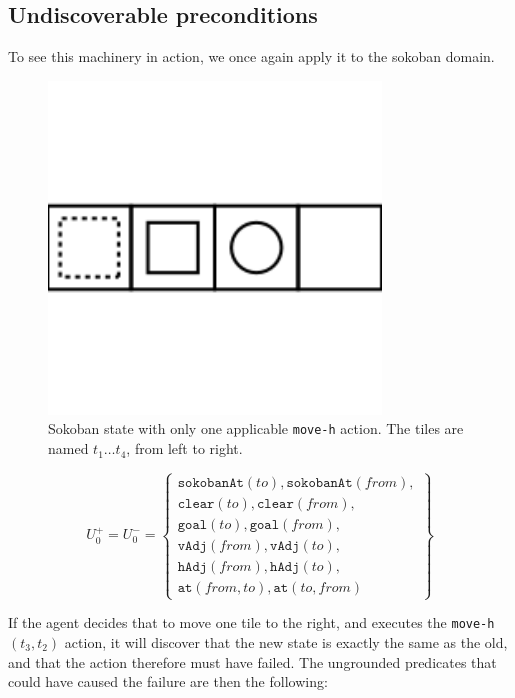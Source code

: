 \documentclass[../Master.tex]{subfiles}
\begin{document}
\subsection{Undiscoverable preconditions}

To see this machinery in action, we once again apply it to the sokoban domain.

\begin{figure}
    \centering
    \includegraphics[scale=0.7]{../Graphics/sokoSmall}
    \caption{\label{fig:sokoSmall} Sokoban state with only one applicable \texttt{move-h} action. The tiles are named $t_1 \dots t_4$, from left to right.}
\end{figure}


\begin{equation}
U_0^+ = U_0^- =
\left\{
    \begin{gathered}
        \texttt{sokobanAt}(to), \texttt{sokobanAt}(from), \\
        \texttt{clear}(to), \texttt{clear}(from), \\
        \texttt{goal}(to), \texttt{goal}(from), \\
        \texttt{vAdj}(from), \texttt{vAdj}(to), \\
        \texttt{hAdj}(from), \texttt{hAdj}(to), \\
        \texttt{at}(from, to), \texttt{at}(to, from)
    \end{gathered}
\right\}
\end{equation}

If the agent decides that to move one tile to the right, and executes the \texttt{move-h}$(t_3, t_2)$ action, it will discover that the new state is exactly the same as the old, and that the action therefore must have failed. The ungrounded predicates that could have caused the failure are then the following:
\end{document}
